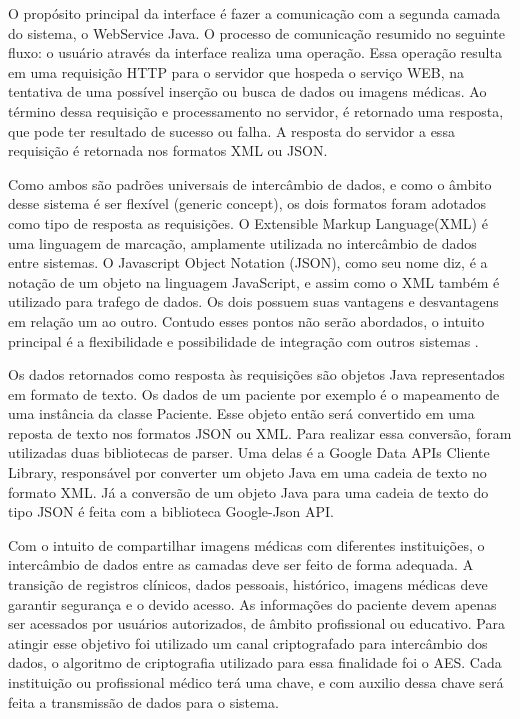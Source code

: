 O propósito principal da interface é fazer a comunicação com a segunda camada do sistema, o WebService Java.
O processo de comunicação resumido no seguinte fluxo: o usuário através da interface realiza uma operação.
Essa operação resulta em uma requisição HTTP para o servidor que hospeda o serviço WEB, na tentativa de uma possível inserção ou busca de dados ou imagens médicas.
Ao término dessa requisição e processamento no servidor, é retornado uma resposta, que pode ter resultado de sucesso ou falha.
A resposta do servidor a essa requisição é retornada nos formatos XML ou JSON.

Como ambos são padrões universais de intercâmbio de dados, e como o âmbito desse sistema é ser flexível (generic concept), os dois formatos foram adotados como tipo de resposta as requisições.
O Extensible Markup Language(XML) é uma linguagem de marcação, amplamente utilizada no intercâmbio de dados entre sistemas.
O Javascript Object Notation (JSON), como seu nome diz, é a notação de um objeto na linguagem JavaScript, e assim como o XML também é utilizado para trafego de dados.
Os dois possuem suas vantagens e desvantagens em relação um ao outro.
Contudo esses pontos não serão abordados, o intuito principal é a flexibilidade e possibilidade de integração com outros sistemas \cite{REF18}.

Os dados retornados como resposta às requisições são objetos Java representados em formato de texto.
Os dados de um paciente por exemplo é o mapeamento de uma instância da classe Paciente.
Esse objeto então será convertido em uma reposta de texto nos formatos JSON ou XML.
Para realizar essa conversão, foram utilizadas duas bibliotecas de parser.
Uma delas é a Google Data APIs Cliente Library, responsável por converter um objeto Java em uma cadeia de texto no formato XML.
Já  a conversão de um objeto Java para uma cadeia de texto do tipo JSON é feita com a biblioteca Google-Json API.

Com o intuito de compartilhar imagens médicas com diferentes instituições, o intercâmbio de dados entre as camadas deve ser feito de forma adequada.
A transição de registros clínicos, dados pessoais, histórico, imagens médicas deve garantir segurança e o devido acesso.
As informações do paciente devem apenas ser acessados por usuários autorizados, de âmbito profissional ou educativo.
Para atingir esse objetivo foi utilizado um canal criptografado para intercâmbio dos dados, o algoritmo de criptografia utilizado para essa finalidade foi o AES.
Cada instituição ou profissional médico terá uma chave, e com auxilio dessa chave será feita a transmissão de dados para o sistema.

